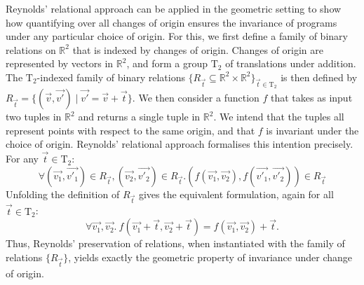 \documentclass{sigplanconf}
\newcommand{\Transl}[1]{\mathrm{T}_#1}
\newcommand{\sepbar}{\mathrel|}
\newcommand{\statementref}[1]{\hyperref[#1]{Statement~\ref*{#1}}}
\theoremstyle{examplestyle}
\theoremstyle{restatementstyle}
\begin{document}
Reynolds' relational approach can be applied in the geometric setting
to show how quantifying over all changes of origin ensures the
invariance of programs under any particular choice of origin. For
this, we first define a family of binary relations on $\mathbb{R}^2$
that is indexed by changes of origin. Changes of origin are
represented by vectors in $\mathbb{R}^2$, and form a group
$\Transl{2}$ of translations under addition. The $\Transl{2}$-indexed
family of binary relations $\{ R_{\vec{t}} \subseteq \mathbb{R}^2
\times \mathbb{R}^2 \}_{\vec{t} \in \Transl{2}}$ is then defined by
$R_{\vec{t}} = \{ (\vec{v}, \vec{v'}) \sepbar \vec{v'} = \vec{v} + \vec{t} \}$.
We then consider a function $f$ that takes as input two tuples in
$\mathbb{R}^2$ and returns a single tuple in $\mathbb{R}^2$. We intend
that the tuples all represent points with respect to the same origin,
and that $f$ is invariant under the choice of origin.  Reynolds'
relational approach formalises this intention precisely. For any
$\vec{t} \in \Transl{2}$: %
\begin{equation}\label{eq:f-preserve-rel-frame}
  \forall (\vec{v_1},\vec{v'_1}) \in R_{\vec{t}},
  (\vec{v_2},\vec{v'_2}) \in R_{\vec{t}}. (f(\vec{v_1}, \vec{v_2}),
  f(\vec{v'_1}, \vec{v'_2})) \in R_{\vec{t}}
\end{equation}
Unfolding the definition of $R_{\vec{t}}$ gives the equivalent formulation,
again for all $\vec{t} \in \Transl{2}$:
\begin{equation}\label{eq:f-invariant-frame}
  \forall \vec{v_1}, \vec{v_2}.\ f(\vec{v_1} + \vec{t},\vec{v_2} +
  \vec{t}) = f(\vec{v_1},\vec{v_2}) + \vec{t}.
\end{equation}
Thus, Reynolds' preservation of relations, when instantiated with the
family of relations $\{R_{\vec{t}}\}$, yields exactly the geometric
property of invariance under change of origin.
\end{document}

